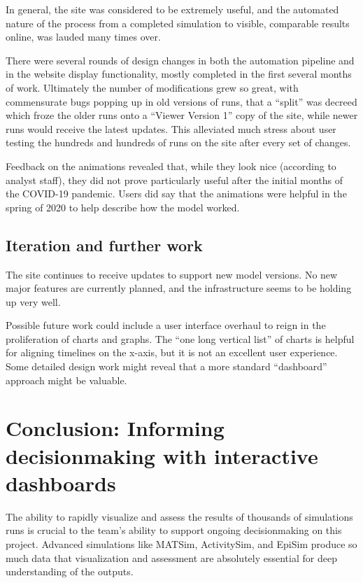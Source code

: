 In general, the site was considered to be extremely useful, and the automated nature of the process from a completed simulation to visible, comparable results online, was lauded many times over.

There were several rounds of design changes in both the automation pipeline and in the website display functionality, mostly completed in the first several months of work. Ultimately the number of modifications grew so great, with commensurate bugs popping up in old versions of runs, that a ``split'' was decreed which froze the older runs onto a ``Viewer Version 1'' copy of the site, while newer runs would receive the latest updates. This alleviated much stress about user testing the hundreds and hundreds of runs on the site after every set of changes.

Feedback on the animations revealed that, while they look nice (according to analyst staff), they did not prove particularly useful after the initial months of the COVID-19 pandemic. Users did say that the animations were helpful in the spring of 2020 to help describe how the model worked.

\hypertarget{covid-iteration-and-further-work}{%
\subsection{Iteration and further work}\label{covid-iteration-and-further-work}}

The site continues to receive updates to support new model versions. No new major features are currently planned, and the infrastructure seems to be holding up very well.

Possible future work could include a user interface overhaul to reign in the proliferation of charts and graphs. The ``one long vertical list'' of charts is helpful for aligning timelines on the x-axis, but it is not an excellent user experience. Some detailed design work might reveal that a more standard ``dashboard'' approach might be valuable.

\hypertarget{covid-informing-decisionmaking-with-comparison-dashboards}{%
\section{Conclusion: Informing decisionmaking with interactive dashboards}\label{covid-informing-decisionmaking}}

The ability to rapidly visualize and assess the results of thousands of simulations runs is crucial to the team's ability to support ongoing decisionmaking on this project. Advanced simulations like MATSim, ActivitySim, and EpiSim produce so much data that visualization and assessment are absolutely essential for deep understanding of the outputs.

